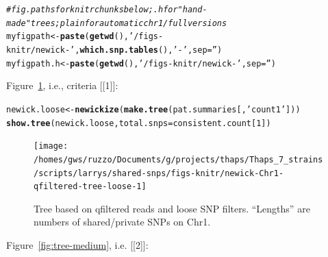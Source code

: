 \documentclass{article}\usepackage[]{graphicx}\usepackage[]{color}
\makeatletter
\newcommand{\hlnum}[1]{\textcolor[rgb]{0.686,0.059,0.569}{#1}}%
\newcommand{\hlstr}[1]{\textcolor[rgb]{0.192,0.494,0.8}{#1}}%
\newcommand{\hlcom}[1]{\textcolor[rgb]{0.678,0.584,0.686}{\textit{#1}}}%
\newcommand{\hlstd}[1]{\textcolor[rgb]{0.345,0.345,0.345}{#1}}%
\newcommand{\hlkwb}[1]{\textcolor[rgb]{0.69,0.353,0.396}{#1}}%
\newcommand{\hlkwc}[1]{\textcolor[rgb]{0.333,0.667,0.333}{#1}}%
\newcommand{\hlkwd}[1]{\textcolor[rgb]{0.737,0.353,0.396}{\textbf{#1}}}%
\newenvironment{kframe}{%
 \def\at@end@of@kframe{}%
 \ifinner\ifhmode%
  \def\at@end@of@kframe{\end{minipage}}%
  \begin{minipage}{\columnwidth}%
 \fi\fi%
 \def\FrameCommand##1{\hskip\@totalleftmargin \hskip-\fboxsep
 \colorbox{shadecolor}{##1}\hskip-\fboxsep
     \hskip-\linewidth \hskip-\@totalleftmargin \hskip\columnwidth}%
 \MakeFramed {\advance\hsize-\width
   \@totalleftmargin\z@ \linewidth\hsize
   \@setminipage}}%
 {\par\unskip\endMakeFramed%
 \at@end@of@kframe}
\newenvironment{knitrout}{}{} %
\makeatother
\begin{document}
\begin{knitrout}\scriptsize
{}\color{fgcolor}\begin{kframe}
\begin{alltt}
\hlcom{# fig.paths for knitr chunks below;  .h for "hand-made" trees; plain for automatic chr1/full versions}
\hlstd{myfigpath}   \hlkwb{<-} \hlkwd{paste}\hlstd{(}\hlkwd{getwd}\hlstd{(),} \hlstr{'/figs-knitr/newick-'}\hlstd{,} \hlkwd{which.snp.tables}\hlstd{(),} \hlstr{'-'}\hlstd{,} \hlkwc{sep}\hlstd{=}\hlstr{''}\hlstd{)}
\hlstd{myfigpath.h} \hlkwb{<-} \hlkwd{paste}\hlstd{(}\hlkwd{getwd}\hlstd{(),} \hlstr{'/figs-knitr/newick-'}\hlstd{,} \hlkwc{sep}\hlstd{=}\hlstr{''}\hlstd{)}
\end{alltt}
\end{kframe}
\end{knitrout}

Figure~\ref{fig:tree-loose}, i.e., criteria [[1]]:

\begin{knitrout}\scriptsize
{}\color{fgcolor}\begin{kframe}
\begin{alltt}
\hlstd{newick.loose} \hlkwb{<-} \hlkwd{newickize}\hlstd{(}\hlkwd{make.tree}\hlstd{(pat.summaries[,}\hlstr{'count1'}\hlstd{]))}
\hlkwd{show.tree}\hlstd{(newick.loose,} \hlkwc{total.snps}\hlstd{=consistent.count[}\hlnum{1}\hlstd{])}
\end{alltt}
\end{kframe}\begin{figure}

{\centering \texttt{[image: /homes/gws/ruzzo/Documents/g/projects/thaps/Thaps\_7\_strains/scripts/larrys/shared-snps/figs-knitr/newick-Chr1-qfiltered-tree-loose-1]} 

}

\caption[Tree based on qfiltered reads and loose SNP filters]{Tree based on qfiltered reads and loose SNP filters.  ``Lengths'' are numbers of shared/private SNPs on Chr1.}\label{fig:tree-loose}
\end{figure}


\end{knitrout}

Figure~\ref{fig:tree-medium}, i.e. [[2]]:
\end{document}
